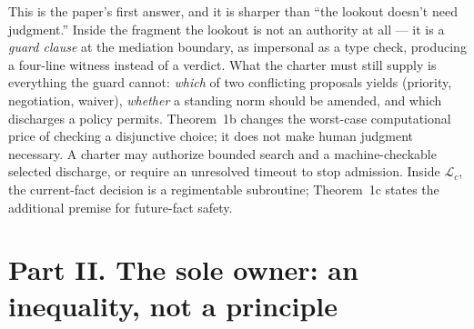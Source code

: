 \documentclass[11pt,a4paper]{article}
\begin{document}
This is the paper's first answer, and it is sharper than ``the lookout doesn't need judgment.'' Inside the fragment the lookout is
not an authority at all --- it is a \emph{guard clause} at the mediation boundary, as impersonal as a type check, producing a
four-line witness instead of a verdict. What the charter must still supply is everything the guard cannot: \emph{which} of two
conflicting proposals yields (priority, negotiation, waiver), \emph{whether} a standing norm should be amended, and which
discharges a policy permits. Theorem~1b changes the worst-case computational price of checking a disjunctive choice;
it does not make human judgment necessary. A charter may authorize bounded search and a machine-checkable selected
discharge, or require an unresolved timeout to stop admission. Inside $\mathcal{L}_c$, the current-fact decision is a
regimentable subroutine; Theorem~1c states the additional premise for future-fact safety.

\section{Part II. The sole owner: an inequality, not a principle}\label{sec:queue}\label{sec:thm-boundary}
\end{document}
